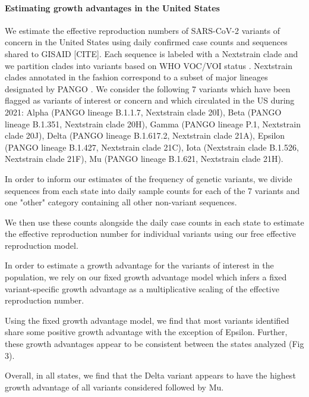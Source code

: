 \documentclass[11pt,oneside,letterpaper]{article}
\begin{document}
\paragraph{Estimating growth advantages in the United States}

We estimate the effective reproduction numbers of SARS-CoV-2 variants of concern in the United States using daily confirmed case counts and sequences shared to GISAID [CITE]. %
Each sequence is labeled with a Nextstrain clade \cite{Hadfield2018} and we partition clades into variants based on WHO VOC/VOI status \cite{Konings2021}.
Nextstrain clades annotated in the fashion correspond to a subset of major lineages designated by PANGO \cite{Rambaut2020}.
We consider the following 7 variants which have been flagged as variants of interest or concern and which circulated in the US during 2021: Alpha (PANGO lineage B.1.1.7, Nextstrain clade 20I), Beta (PANGO lineage B.1.351, Nextstrain clade 20H), Gamma (PANGO lineage P.1, Nextstrain clade 20J), Delta (PANGO lineage B.1.617.2, Nextstrain clade 21A), Epsilon (PANGO lineage B.1.427, Nextstrain clade 21C), Iota (Nextstrain clade B.1.526, Nextstrain clade 21F), Mu (PANGO lineage B.1.621, Nextstrain clade 21H).

In order to inform our estimates of the frequency of genetic variants, we divide sequences from each state into daily sample counts for each of the 7 variants and one "other" category containing all other non-variant sequences.

We then use these counts alongside the daily case counts in each state to estimate the effective reproduction number for individual variants using our free effective reproduction model.


In order to estimate a growth advantage for the variants of interest in the population, we rely on our fixed growth advantage model which infers a fixed variant-specific growth advantage as a multiplicative scaling of the effective reproduction number.

Using the fixed growth advantage model, we find that most variants identified share some positive growth advantage with the exception of Epsilon.
Further, these growth advantages appear to be consistent between the states analyzed (Fig 3).

Overall, in all states, we find that the Delta variant appears to have the highest growth advantage of all variants considered followed by Mu.
\end{document}
